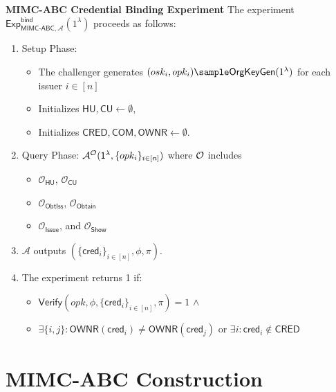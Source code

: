 \noindent \textbf{MIMC-ABC Credential Binding Experiment} The experiment $\mathsf{Exp}^{\mathsf{bind}}_{\mathsf{MIMC\mbox{-}ABC},\mathcal{A}}(1^\lambda)$ proceeds as follows:
\begin{enumerate}
    \item Setup Phase:
    \begin{itemize}
        \item The challenger generates $(osk_i, opk_i) \sample \mathsf{OrgKeyGen}(1^\lambda)$ for each issuer $i \in [n]$
        \item Initializes $\mathsf{HU, CU} \gets \emptyset$, 
        \item Initializes $\mathsf{CRED, COM, OWNR} \gets \emptyset$. 
    \end{itemize}

    \item Query Phase: $\mathcal{A}^{\mathcal{O}}(\mathsf{1^{\lambda}}, \{opk_i\}_{i \in [n]})$ where $\mathcal{O}$ includes 
    \begin{itemize}
        \item $\mathcal{O}_{\mathsf{HU}}$, $\mathcal{O}_{\mathsf{CU}}$
        \item $\mathcal{O}_{\mathsf{ObtIss}}$, $\mathcal{O}_{\mathsf{Obtain}}$
        \item $\mathcal{O}_{\mathsf{Issue}}$, and $\mathcal{O}_{\mathsf{Show}}$
    \end{itemize}

    \item $\mathcal{A}$ outputs $(\{\mathsf{cred}_i\}_{i \in [n]}, \phi, \pi)$. 
    \item The experiment returns 1 if:
    \begin{itemize}
        \item $\mathsf{Verify}(opk, \phi, \{\mathsf{cred}_i\}_{i \in [n]}, \pi) = 1$ $\wedge$
        \item $\exists \{i,j\}: \mathsf{OWNR}(\mathsf{cred}_i) \neq \mathsf{OWNR}(\mathsf{cred}_j)$ or $\exists i: \mathsf{cred}_i \notin \mathsf{CRED}$
    \end{itemize}
\end{enumerate}










\newpage
\section{MIMC-ABC Construction}\label{sec:mimcabc-construction}
